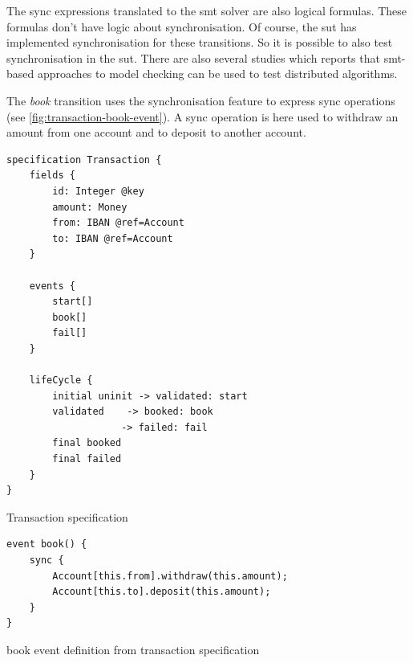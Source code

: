 The sync expressions translated to the \gls{smt} solver are also logical formulas.
These formulas don't have logic about synchronisation. Of course, the \gls{sut} has
implemented synchronisation for these transitions. So it is possible to also
test synchronisation in the \gls{sut}. There are also several studies which reports
that \gls{smt}-based approaches to model checking can be used to test distributed
algorithms.~\cite{konnov2015you, alberti2015smt, mccaffrey2016verification}


The \textit{book} transition uses the synchronisation feature to express sync
operations (see \autoref{fig:transaction-book-event}). A sync operation is here
used to withdraw an amount from one account and to deposit to another account.


\begin{sourcecode}[h!]
\begin{lstlisting}[]
specification Transaction {
	fields {
		id: Integer @key
		amount: Money
		from: IBAN @ref=Account
		to: IBAN @ref=Account
	}

	events {
		start[]
		book[]
		fail[]
	}

	lifeCycle {
		initial uninit -> validated: start
		validated    -> booked: book
					-> failed: fail
		final booked
		final failed
	}
}
\end{lstlisting}
\caption{Transaction specification}\label{fig:transaction-spec}
\end{sourcecode}
\FloatBarrier

\begin{sourcecode}[h!]
\begin{lstlisting}[]
event book() {
	sync {
		Account[this.from].withdraw(this.amount);
		Account[this.to].deposit(this.amount);
	}
}
\end{lstlisting}
\caption{book event definition from transaction specification}\label{fig:transaction-book-event}
\end{sourcecode}
\FloatBarrier

